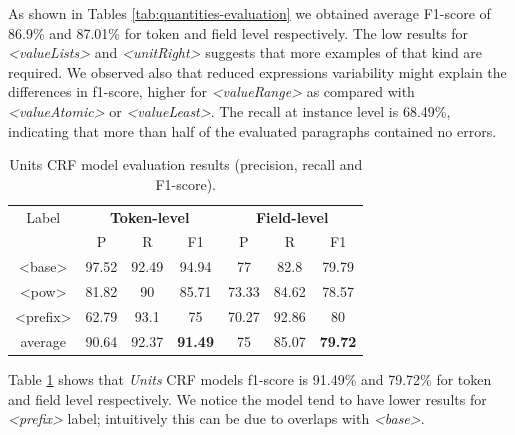 \documentclass[sigconf]{acmart}
\begin{document}
As shown in Tables \ref{tab:quantities-evaluation} we obtained average F1-score of 86.9\% and 87.01\% for token and field level respectively. The low results for \textit{<valueLists>} and \textit{<unitRight>} suggests that more examples of that kind are required.  We observed also that reduced expressions variability might explain the differences in f1-score, higher for \textit{<valueRange>} as  compared with \textit{<valueAtomic>} or \textit{<valueLeast>}. The recall at instance level is 68.49\%, indicating that more than half of the evaluated paragraphs contained no errors. 

\begin{table}[ht]
    \caption{Units CRF model evaluation results (precision, recall and F1-score).}
    \label{tab:units-evaluation}
    \begin{tabular}{c|ccc|ccc}
        \toprule
        Label & \multicolumn{3}{c}{\textbf{Token-level}} & \multicolumn{3}{c}{\textbf{Field-level}}\\
        & P & R & F1 & P & R & F1 \\
        \midrule
        <base>    & 97.52 & 92.49 & 94.94 & 77    & 82.8  & 79.79 \\
        <pow>     & 81.82 & 90    & 85.71 & 73.33 & 84.62 & 78.57 \\
        <prefix>  & 62.79 & 93.1  & 75    & 70.27 & 92.86 & 80    \\
        \midrule
        average   & 90.64  & 92.37 & \textbf{91.49} & 75   & 85.07 & \textbf{79.72} \\
        \bottomrule
   \end{tabular}
\end{table}

Table \ref{tab:units-evaluation} shows that \textit{Units} CRF models f1-score is 91.49\% and 79.72\% for token and field level respectively. We notice the model tend to have lower results for \textit{<prefix>} label; intuitively this can be due to overlaps with \textit{<base>}.
\end{document}
